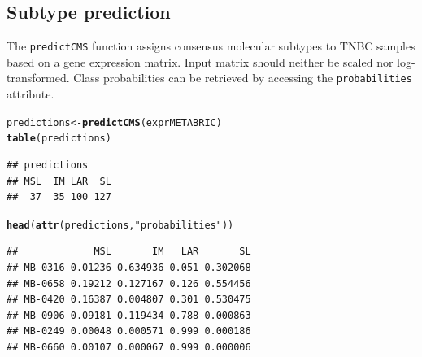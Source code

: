 \documentclass{article}\usepackage[]{graphicx}\usepackage[]{color}
\makeatletter
\newcommand{\hlstr}[1]{\textcolor[rgb]{0.192,0.494,0.8}{#1}}%
\newcommand{\hlstd}[1]{\textcolor[rgb]{0.345,0.345,0.345}{#1}}%
\newcommand{\hlkwb}[1]{\textcolor[rgb]{0.69,0.353,0.396}{#1}}%
\newcommand{\hlkwd}[1]{\textcolor[rgb]{0.737,0.353,0.396}{\textbf{#1}}}%
\newenvironment{kframe}{%
 \def\at@end@of@kframe{}%
 \ifinner\ifhmode%
  \def\at@end@of@kframe{\end{minipage}}%
  \begin{minipage}{\columnwidth}%
 \fi\fi%
 \def\FrameCommand##1{\hskip\@totalleftmargin \hskip-\fboxsep
 \colorbox{shadecolor}{##1}\hskip-\fboxsep
     \hskip-\linewidth \hskip-\@totalleftmargin \hskip\columnwidth}%
 \MakeFramed {\advance\hsize-\width
   \@totalleftmargin\z@ \linewidth\hsize
   \@setminipage}}%
 {\par\unskip\endMakeFramed%
 \at@end@of@kframe}
\newenvironment{knitrout}{}{} %
\makeatother
\begin{document}
\subsection{Subtype prediction}
The \texttt{predictCMS} function assigns consensus molecular subtypes to TNBC samples based on a gene expression matrix. Input matrix should neither be scaled nor log-transformed. Class probabilities can be retrieved by accessing the \texttt{probabilities} attribute.
\begin{knitrout}
\color{fgcolor}\begin{kframe}
\begin{alltt}
\hlstd{predictions} \hlkwb{<-} \hlkwd{predictCMS}\hlstd{(exprMETABRIC)}
\hlkwd{table}\hlstd{(predictions)}
\end{alltt}
\begin{verbatim}
## predictions
## MSL  IM LAR  SL 
##  37  35 100 127
\end{verbatim}
\begin{alltt}
\hlkwd{head}\hlstd{(}\hlkwd{attr}\hlstd{(predictions,} \hlstr{"probabilities"}\hlstd{))}
\end{alltt}
\begin{verbatim}
##             MSL       IM   LAR       SL
## MB-0316 0.01236 0.634936 0.051 0.302068
## MB-0658 0.19212 0.127167 0.126 0.554456
## MB-0420 0.16387 0.004807 0.301 0.530475
## MB-0906 0.09181 0.119434 0.788 0.000863
## MB-0249 0.00048 0.000571 0.999 0.000186
## MB-0660 0.00107 0.000067 0.999 0.000006
\end{verbatim}
\end{kframe}
\end{knitrout}
\end{document}
